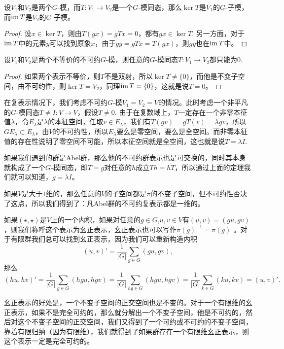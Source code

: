 \begin{lem}
设$V_1$和$V_2$是两个$G$-模，而$T:V_1\to V_2$是一个$G$-模同态，那么$\ker T$是$V_1$的$G$-子模，而$\operatorname{im} T$是$V_2$的$G$-子模。
\end{lem}

\begin{proof}
设$x\in \ker T$，则由$T(gx)=gTx=0$，都有$gx\in \ker T$. 另一方面，对于$\operatorname{im} T$中的元素$y$可以找到原象$x$，由于$gy=gTx=T(gx)$，则$gy$也在$\operatorname{im} T$中。
\end{proof}

\begin{lem}[Schur引理]
设$V_1$和$V_2$是两个不等价的不可约$G$-模，则任意的$G$-模同态$T:V_1\to V_2$都只能为$0$.
\end{lem}

\begin{proof}
如果两个表示不等价，则$T$不是双射，所以$\ker T\neq \{0\}$，而他是不变子空间，由不可约性，则$\ker T= V_2$，同理$\operatorname{im}  T= \{0\}$，这就是说$T=0$。
\end{proof}

在复表示情况下，我们考虑不可约$G$-模$V_1=V_2=V$的情况。此时考虑一个非平凡的$G$-模同态$T\neq I:V\to V$，假设$T\neq 0$. 由于在复数域上，$T$一定存在一个非零本征值$\lambda$，令$E_\lambda$是$\lambda$的本征空间，任取$v\in E_\lambda$，我们有$T(gv)=g T(v)=\lambda gv$，所以$GE_\lambda\subset E_\lambda$，由$V$的不可约性，所以$E_\lambda$要么是零空间，要么是全空间。而非零本征值的存在性说明了零空间不可能，所以本征空间就是全空间，这也就是说$T=\lambda I$.

\para 如果我们遇到的群是Abel群，那么他的不可约群表示也是可交换的，同时其本身就构成了一个$G$-模同态，即$T=g$对任意的$h$成立$Th=h T$，所以通过上面的定理我们就可以知道，$g=\lambda I$。

如果$V$是大于$1$维的，那么任意的$V$的子空间都是$\pi$的不变子空间，但不可约性否决了这点，所以我们得到了：凡Abel群的不可约复表示都是一维的。

\para 如果$(\star,\star)$是$V$上的一个内积，如果对任意的$g\in G$,$u,v\in V$有$(u,v)=(gu,gv)$，则我们称呼这个表示为幺正表示，幺正表示也可以写作$\pi(g)^{-1}=\pi(g)^\dag$。对于有限群我们总可以找到幺正表示，因为我们可以重新构造内积
\[
	(u,v)'=\frac{1}{|G|}\sum_{g\in G}(gu,gv),
\]
那么
\[
	(hu,hv)'=\frac{1}{|G|}\sum_{g\in G}(hgu,hgv)=\frac{1}{|G|}\sum_{hg\in G}(hgu,hgv)=\frac{1}{|G|}\sum_{k\in G}(ku,kv)=(u,v)'.
\]

幺正表示的好处是，一个不变子空间的正交空间也是不变的。对于一个有限维的幺正表示，如果不是完全可约的，那么就分解出一个不变子空间，他是不可约的，然后对这个不变子空间的正交空间，我们又得到了一个可约或不可约的不变子空间，靠着有限归纳（因为有限维），我们就得到了如果群存在一个有限维幺正表示，则这个表示一定是完全可约的。

